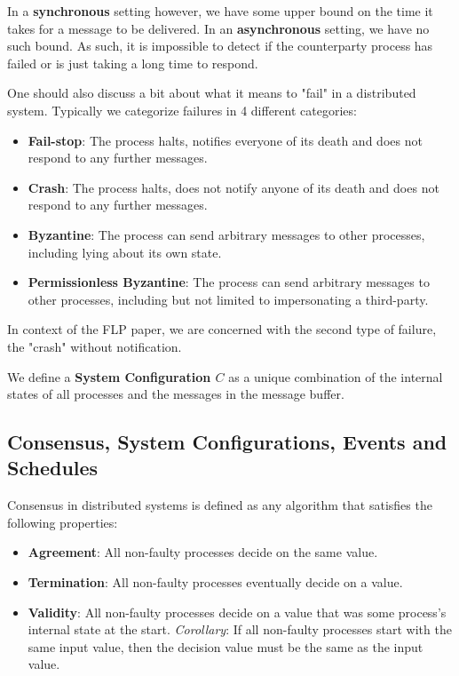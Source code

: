 In a \textbf{synchronous} setting however, we have some upper bound on the time it takes for a message to be delivered. In an \textbf{asynchronous} setting, we have no such bound. As such, it is impossible to detect if the counterparty process has failed or is just taking a long time to respond.

One should also discuss a bit about what it means to "fail" in a distributed system. Typically we categorize failures in 4 different categories:
\begin{itemize}
    \item \textbf{Fail-stop}: The process halts, notifies everyone of its death and does not respond to any further messages.
    \item \textbf{Crash}: The process halts, does not notify anyone of its death and does not respond to any further messages.
    \item \textbf{Byzantine}: The process can send arbitrary messages to other processes, including lying about its own state.
    \item \textbf{Permissionless Byzantine}: The process can send arbitrary messages to other processes, including but not limited to impersonating a third-party.
\end{itemize}

In context of the FLP paper, we are concerned with the second type of failure, the "crash" without notification.

We define a \textbf{System Configuration $C$} as a unique combination of the internal states of all processes and the messages in the message buffer.

\subsection{Consensus, System Configurations, Events and Schedules}
Consensus in distributed systems is defined as any algorithm that satisfies the following properties:
\begin{itemize}
    \item \textbf{Agreement}: All non-faulty processes decide on the same value.
    \item \textbf{Termination}: All non-faulty processes eventually decide on a value.
    \item \textbf{Validity}: All non-faulty processes decide on a value that was some process's internal state at the start. \emph{Corollary}: If all non-faulty processes start with the same input value, then the decision value must be the same as the input value.
\end{itemize}

